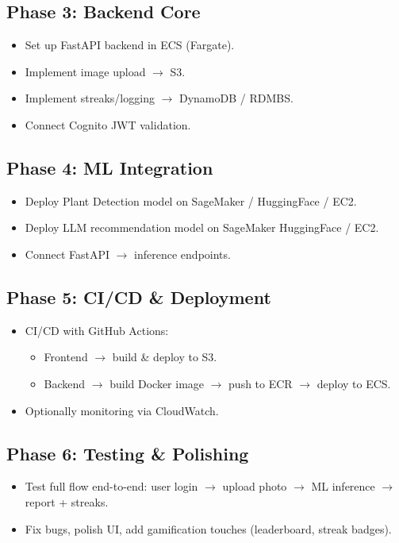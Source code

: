 \documentclass[11pt]{article}
\begin{document}
\subsection*{Phase 3: Backend Core}
\begin{itemize}
    \item Set up FastAPI backend in ECS (Fargate).
    \item Implement image upload $\rightarrow$ S3.
    \item Implement streaks/logging $\rightarrow$ DynamoDB / RDMBS.
    \item Connect Cognito JWT validation.
\end{itemize}

\subsection*{Phase 4: ML Integration}
\begin{itemize}
    \item Deploy Plant Detection model on SageMaker / HuggingFace / EC2.
    \item Deploy LLM recommendation model on SageMaker HuggingFace / EC2.
    \item Connect FastAPI $\rightarrow$ inference endpoints.
\end{itemize}

\subsection*{Phase 5: CI/CD \& Deployment}
\begin{itemize}
    \item CI/CD with GitHub Actions:
    \begin{itemize}
        \item Frontend $\rightarrow$ build \& deploy to S3.
        \item Backend $\rightarrow$ build Docker image $\rightarrow$ push to ECR $\rightarrow$ deploy to ECS.
    \end{itemize}
    \item Optionally monitoring via CloudWatch.
\end{itemize}

\subsection*{Phase 6: Testing \& Polishing}
\begin{itemize}
    \item Test full flow end-to-end: user login $\rightarrow$ upload photo $\rightarrow$ ML inference $\rightarrow$ report + streaks.
    \item Fix bugs, polish UI, add gamification touches (leaderboard, streak badges).
\end{itemize}
\end{document}
